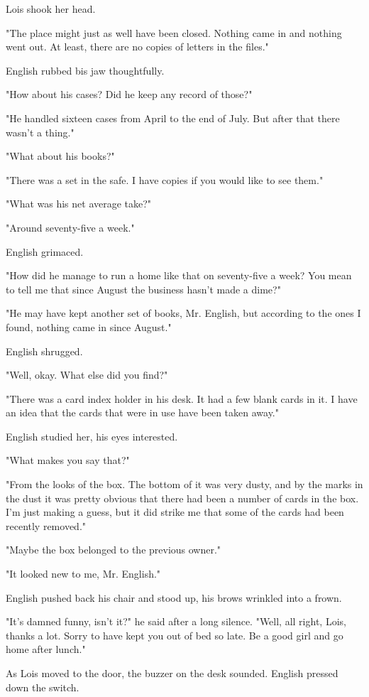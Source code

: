 \documentclass{novel}
\begin{document}
Lois shook her head.

"The place might just as well have been closed. Nothing came in and nothing went out. At least, there are no copies of letters in the files."

English rubbed bis jaw thoughtfully.

"How about his cases? Did he keep any record of those?"

"He handled sixteen cases from April to the end of July. But after that there wasn't a thing."

"What about his books?"

"There was a set in the safe. I have copies if you would like to see them."

"What was his net average take?"

"Around seventy-five a week."

English grimaced.

"How did he manage to run a home like that on seventy-five a week? You mean to tell me that since August the business hasn't made a dime?"

"He may have kept another set of books, Mr. English, but according to the ones I found, nothing came in since August."

English shrugged.

"Well, okay. What else did you find?"

"There was a card index holder in his desk. It had a few blank cards in it. I have an idea that the cards that were in use have been taken away."

English studied her, his eyes interested.

"What makes you say that?"

"From the looks of the box. The bottom of it was very dusty, and by the marks in the dust it was pretty obvious that there had been a number of cards in the box. I'm just making a guess, but it did strike me that some of the cards had been recently removed."

"Maybe the box belonged to the previous owner."

"It looked new to me, Mr. English."

English pushed back his chair and stood up, his brows wrinkled into a frown.

"It's damned funny, isn't it?" he said after a long silence. "Well, all right, Lois, thanks a lot. Sorry to have kept you out of bed so late. Be a good girl and go home after lunch."

As Lois moved to the door, the buzzer on the desk sounded. English pressed down the switch.
\end{document}

